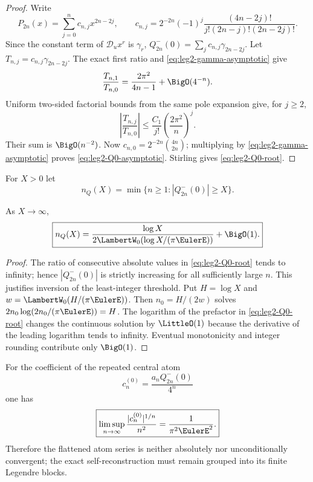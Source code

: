\begin{proof}
Write
\[
 P_{2n}(x)=\sum_{j=0}^{n}c_{n,j}x^{2n-2j},
 \qquad
 c_{n,j}=2^{-2n}(-1)^j
 \frac{(4n-2j)!}{j!(2n-j)!(2n-2j)!}.
\]
Since the constant term of $\mathscr D_ux^r$ is $\gamma_r$,
$Q_{2n}^-(0)=\sum_jc_{n,j}\gamma_{2n-2j}$.  Let
$T_{n,j}=c_{n,j}\gamma_{2n-2j}$.  The exact first ratio and
\eqref{eq:leg2-gamma-asymptotic} give
\[
 \frac{T_{n,1}}{T_{n,0}}
 =\frac{2\pi^2}{4n-1}+\BigO(4^{-n}).
\]
Uniform two-sided factorial bounds from the same pole expansion give, for
$j\ge2$,
\[
 \left|\frac{T_{n,j}}{T_{n,0}}\right|
 \le\frac{C_1}{j!}\left(\frac{2\pi^2}{n}\right)^j.
\]
Their sum is $\BigO(n^{-2})$.  Now
$c_{n,0}=2^{-2n}\binom{4n}{2n}$; multiplying by
\eqref{eq:leg2-gamma-asymptotic} proves
\eqref{eq:leg2-Q0-asymptotic}.  Stirling gives
\eqref{eq:leg2-Q0-root}.
\end{proof}

For $X>0$ let
\[
 n_Q(X)=\min\{n\ge1:|Q_{2n}^-(0)|\ge X\}.
\]

\begin{corollary}
\label{cor:leg2-Q-Lambert}
As $X\to\infty$,
\begin{equation}
 \boxed{n_Q(X)=
 \frac{\log X}
 {2\LambertW_0\!\left(\log X/(\pi\EulerE)\right)}+\BigO(1).}
 \label{eq:leg2-Q-Lambert}
\end{equation}
\end{corollary}

\begin{proof}
The ratio of consecutive absolute values in
\eqref{eq:leg2-Q0-root} tends to infinity; hence
$|Q_{2n}^-(0)|$ is strictly increasing for all sufficiently large $n$.  This
justifies inversion of the least-integer threshold.  Put $H=\log X$ and
$w=\LambertW_0(H/(\pi\EulerE))$.  Then $n_0=H/(2w)$ solves
$2n_0\log(2n_0/(\pi\EulerE))=H$.  The logarithm of the prefactor in
\eqref{eq:leg2-Q0-root} changes the continuous solution by $\LittleO(1)$ because the
derivative of the leading logarithm tends to infinity.  Eventual monotonicity
and integer rounding contribute only $\BigO(1)$.
\end{proof}

\begin{theorem}
\label{thm:leg2-central-growth}
For the coefficient of the repeated central atom
\[
 c_n^{(0)}=\frac{a_nQ_{2n}^-(0)}{4^n}
\]
one has
\begin{equation}
 \boxed{\limsup_{n\to\infty}
 \frac{|c_n^{(0)}|^{1/n}}{n^2}
 =\frac1{\pi^2\EulerE^2}.}
 \label{eq:leg2-central-growth}
\end{equation}
Therefore the flattened atom series is neither absolutely nor
unconditionally convergent; the exact self-reconstruction must remain grouped
into its finite Legendre blocks.
\end{theorem}

